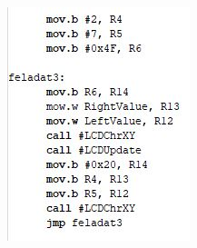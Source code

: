 \documentclass[10pt, conference, a4paper]{ITKproc}
\begin{document}
\begin{figure}[h]
\includegraphics[scale=0.65]{3feladat}
\centering
\end{figure}










%


\end{document}
